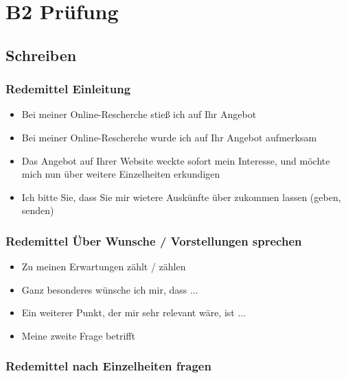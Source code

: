 \chapter{B2 Prüfung}

\section{Schreiben}

\subsection{Redemittel Einleitung}

\begin{itemize}
    \item Bei meiner Online-Rescherche stieß ich auf Ihr Angebot
    \item Bei meiner Online-Rescherche wurde ich auf Ihr Angebot aufmerksam
    \item Das Angebot auf Ihrer Website weckte sofort mein Interesse, und möchte mich nun über weitere Einzelheiten erkundigen
    \item Ich bitte Sie, dass Sie mir wietere Auskünfte über \akk zukommen lassen (geben, senden)
\end{itemize}

\subsection{Redemittel Über Wunsche / Vorstellungen sprechen}

\begin{itemize}
    \item Zu meinen Erwartungen zählt / zählen
    \item Ganz besonderes wünsche ich mir, dass ...
    \item Ein weiterer Punkt, der mir sehr relevant wäre, ist ...
    \item Meine zweite Frage betrifft \akk
\end{itemize}

\subsection{Redemittel nach Einzelheiten fragen}


